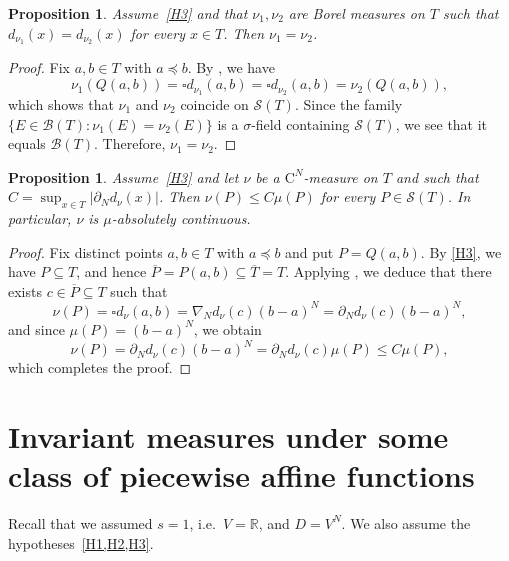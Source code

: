 \documentclass{amsart}
\theoremstyle{plain}%
\newtheorem{proposition}[theorem]{Proposition}
\theoremstyle{definition}
\theoremstyle{remark}
\begin{document}
\begin{proposition}\label{prop:equality_of_measure_with_the_same_distr}
Assume~\cref{H3} and that $\nu_1,\nu_2$ are Borel measures on $T$ such that $d_{\nu_1}(x)=d_{\nu_2}(x)$ for every $x\in T$. Then $\nu_1=\nu_2$.
\end{proposition}

\begin{proof}
Fix $a,b\in T$ with $a\preceq b$.
By , we have
\begin{equation*}
\nu_1(Q(a,b))=\square d_{\nu_1}(a,b)=\square d_{\nu_2}(a,b)=\nu_2(Q(a,b)),
\end{equation*}
which shows that $\nu_1$ and $\nu_2$ coincide on $\mathcal{S}(T)$. Since the family $\{E\in\mathcal{B}(T):\nu_1(E)=\nu_2(E)\}$ is a $\sigma$-field containing $\mathcal{S}(T)$, we see that it equals $\mathcal{B}(T)$. Therefore, $\nu_1=\nu_2$.
\end{proof}

\begin{proposition}\label{prop:absolutely_continuity_of_CN_measures}
Assume~\cref{H3} and let $\nu$ be a $\mathrm{C}^N$\nobreakdash-measure on $T$ and such that $C=\sup_{x\in T} |\partial_N d_\nu(x)|$. Then $\nu(P)\le C\mu(P)$ for every $P\in\mathcal{S}(T)$.
In particular, $\nu$ is $\mu$-absolutely continuous.
\end{proposition}

\begin{proof}
Fix distinct points $a,b\in T$ with $a\preceq b$ and put $P=Q(a,b)$. By \cref{H3}, we have $P\subseteq T$, and hence $\overline{P}=P(a,b)\subseteq \overline{T}=T$. Applying , we deduce that there exists $c\in \overline{P}\subseteq T$ such that
\begin{equation*}
\nu(P)=\square d_\nu(a,b)=\nabla\!_Nd_\nu(c)(b-a)^N=\partial_Nd_\nu(c)(b-a)^N,
\end{equation*}
and since $\mu(P)=(b-a)^N$, we obtain
\begin{equation*}
\nu(P)=\partial_Nd_\nu(c)(b-a)^N= \partial_Nd_\nu(c)\mu(P)\le C\mu(P),
\end{equation*}
which completes the proof.
\end{proof}


\section{Invariant measures under some class of piecewise affine functions}\label{section11}
Recall that we assumed  $s=1$, i.e.\ $V=\mathbb R$, and $D=V^N$. We also assume the hypotheses~\cref{H1,H2,H3}.
\end{document}
